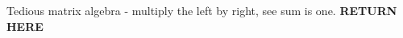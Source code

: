 \documentclass[12pt]{article}
\newenvironment{problem}[2][Problem]{\begin{trivlist}
\item[\hskip \labelsep {\bfseries #1}\hskip \labelsep {\bfseries #2.}]}{\end{trivlist}}
\theoremstyle{definition}
\theoremstyle{definition}
\theoremstyle{definition}
\theoremstyle{definition}
\begin{document}
\begin{problem}{9.15}
Tedious matrix algebra - multiply the left by right, see sum is one. \textbf{RETURN HERE}
\end{problem}

\begin{problem}{9.16}
\end{problem}

\begin{problem}{9.17}
\end{problem}

\begin{problem}{9.18}
\end{problem}

\begin{problem}{9.20}
\end{problem}
\end{document}
